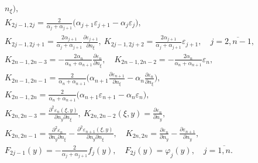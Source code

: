\begin{gather*}
{n_{\xi}}\bigg),\\


%


K_{2j-1,2j}=\frac{2}{\alpha_j+\alpha_{j+1}}


\bigg(\alpha_{j+1}\varepsilon_{j+1} -


\alpha_j\varepsilon_j\bigg),\\


%


K_{2j-1,2j+1}=\frac{2\alpha_{j+1}}{\alpha_j+\alpha_{j+1}}


\frac{\partial \varepsilon_{j+1}}{\partial n_{\xi}},\


K_{2j-1,2j+2}=\frac{2\alpha_{j+1}}{\alpha_j+\alpha_{j+1}}


\varepsilon_{j+1},\quad j=\overline{2,n-1},\\


%


K_{2n-1,2n-3}=-\frac{2\alpha_n}{\alpha_n+\alpha_{n+1}}


\frac{\partial \varepsilon_n}{\partial n_{\xi}},\quad


K_{2n-1,2n-2}=-\frac{2\alpha_n}{\alpha_n+\alpha_{n+1}} \varepsilon_n,\\


%


K_{2n-1,2n-1}=\frac{2}{\alpha_n+\alpha_{n+1}}


\bigg(\alpha_{n+1}\frac{\partial \varepsilon_{n+1}}{\partial


n_{\xi}}- \alpha_n\frac{\partial\varepsilon_n}{\partial


n_{\xi}}\bigg),\\


%


K_{2n-1,2n}=\frac{2}{\alpha_n+\alpha_{n+1}}


\bigg(\alpha_{n+1}\varepsilon_{n+1}- \alpha_n\varepsilon_n\bigg),\\


%


K_{2n,2n-3}=\frac{\partial ^2\varepsilon_n(\xi,y)}{\partial n_y


\partial n_{\xi}},\ K_{2n,2n-2}(\xi,y)=


\frac{\partial \varepsilon_n}{\partial n_y},\\


%


K_{2n,2n-1}=\frac{\partial ^2\varepsilon_n}{\partial n_y


\partial n_{\xi}}-\frac{\partial ^2\varepsilon_{n+1}(\xi,y)}{\partial n_y


\partial n_{\xi}},\quad


K_{2n,2n}=\frac{\partial \varepsilon_n}{\partial n_y}


- \frac{\partial \varepsilon_{n+1}}{\partial n_y},\\


%


F_{2j-1}(y)=-\frac{2}{\alpha_j+\alpha_{j+1}}f_j(y),\quad


F_{2j}(y)=\varphi_j(y),\quad j=\overline{1,n} .


\end{gather*}





